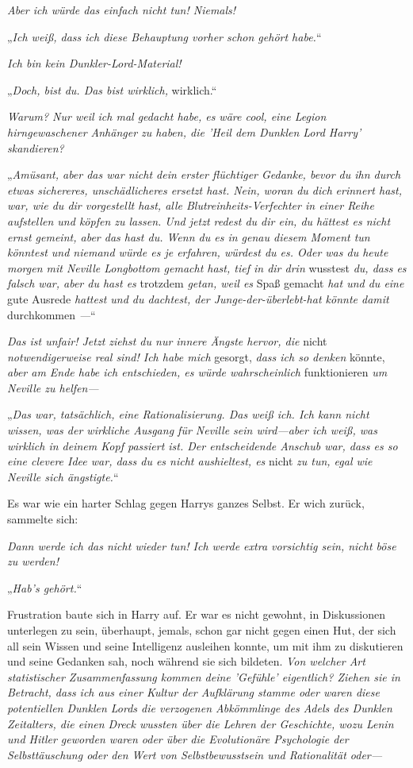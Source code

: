 {\emph{Aber ich würde das einfach nicht tun! Niemals!}

„\emph{Ich weiß, dass ich diese Behauptung vorher schon gehört habe.}“

\emph{Ich bin kein Dunkler-Lord-Material!}

„\emph{Doch, bist du. Das bist wirklich,} wirklich.\emph{}“

\emph{Warum? Nur weil ich mal gedacht habe, es wäre cool, eine Legion hirngewaschener Anhänger zu haben, die 'Heil dem Dunklen Lord Harry' skandieren?}

„\emph{Amüsant, aber das war nicht dein erster flüchtiger Gedanke, bevor du ihn durch etwas sichereres, unschädlicheres ersetzt hast. Nein, woran du dich} \emph{erinnert hast, war, wie du dir vorgestellt hast, alle Blutreinheits-Verfechter in einer Reihe aufstellen und köpfen zu lassen. Und jetzt redest du dir ein, du hättest es nicht ernst gemeint, aber das hast du. Wenn du es in genau diesem Moment tun könntest und niemand würde es je erfahren, würdest du es. Oder was du heute morgen mit Neville Longbottom gemacht hast, tief in dir drin} wusstest \emph{du, dass es falsch war, aber du hast es} trotzdem \emph{getan, weil es} Spaß gemacht \emph{hat und du eine} gute Ausrede \emph{hattest und du dachtest, der Junge-der-überlebt-hat könnte damit} durchkommen \emph{—}“

\emph{Das ist unfair! Jetzt ziehst du nur innere Ängste hervor, die} nicht \emph{notwendigerweise real sind! Ich habe mich} gesorgt, \emph{dass ich so denken} könnte, \emph{aber am Ende habe ich entschieden, es würde wahrscheinlich} funktionieren \emph{um Neville zu helfen—}

„\emph{Das war, tatsächlich, eine Rationalisierung. Das weiß ich. Ich kann nicht wissen, was der wirkliche Ausgang für Neville sein wird—aber ich weiß, was wirklich in deinem Kopf passiert ist. Der entscheidende Anschub war, dass es so eine clevere Idee war, dass du es nicht aushieltest, es} nicht \emph{zu tun, egal wie Neville sich ängstigte.}“

Es war wie ein harter Schlag gegen Harrys ganzes Selbst. Er wich zurück, sammelte sich:

\emph{Dann werde ich das nicht wieder tun! Ich werde extra vorsichtig sein, nicht böse zu werden!}

„\emph{Hab's gehört.}“

Frustration baute sich in Harry auf. Er war es nicht gewohnt, in Diskussionen unterlegen zu sein, überhaupt, jemals, schon gar nicht gegen einen Hut, der sich all sein Wissen und seine Intelligenz ausleihen konnte, um mit ihm zu diskutieren und seine Gedanken sah, noch während sie sich bildeten. \emph{Von welcher Art statistischer Zusammenfassung kommen deine 'Gefühle' eigentlich? Ziehen sie in Betracht, dass ich aus einer Kultur der Aufklärung stamme oder waren diese potentiellen Dunklen Lords die verzogenen Abkömmlinge des Adels des Dunklen Zeitalters, die einen Dreck wussten über die Lehren der Geschichte, wozu Lenin und Hitler geworden waren oder über die Evolutionäre Psychologie der Selbsttäuschung oder den Wert von Selbstbewusstsein und Rationalität oder—}

}
